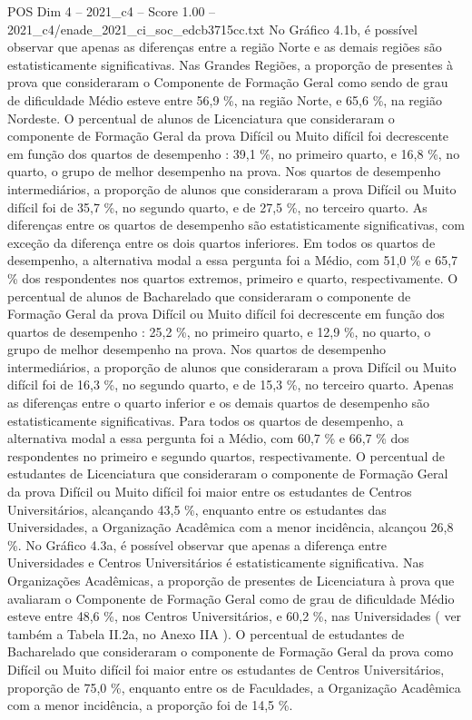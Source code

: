 \begin{textsample}{POS Dim 4 – 2021\_c4 – Score 1.00 – 2021\_c4/enade\_2021\_ci\_soc\_edcb3715cc.txt}
No Gráfico 4.1b, é possível observar que apenas as diferenças entre a região Norte e as demais regiões são estatisticamente significativas.
Nas Grandes Regiões, a proporção de presentes à prova que consideraram o Componente de Formação Geral como sendo de grau de dificuldade Médio esteve entre 56,9 \%, na região Norte, e 65,6 \%, na região Nordeste.
O percentual de alunos de Licenciatura que consideraram o componente de Formação Geral da prova Difícil ou Muito difícil foi decrescente em função dos quartos de desempenho : 39,1 \%, no primeiro quarto, e 16,8 \%, no quarto, o grupo de melhor desempenho na prova.
Nos quartos de desempenho intermediários, a proporção de alunos que consideraram a prova Difícil ou Muito difícil foi de 35,7 \%, no segundo quarto, e de 27,5 \%, no terceiro quarto.
As diferenças entre os quartos de desempenho são estatisticamente significativas, com exceção da diferença entre os dois quartos inferiores.
Em todos os quartos de desempenho, a alternativa modal a essa pergunta foi a Médio, com 51,0 \% e 65,7 \% dos respondentes nos quartos extremos, primeiro e quarto, respectivamente.
O percentual de alunos de Bacharelado que consideraram o componente de Formação Geral da prova Difícil ou Muito difícil foi decrescente em função dos quartos de desempenho : 25,2 \%, no primeiro quarto, e 12,9 \%, no quarto, o grupo de melhor desempenho na prova.
Nos quartos de desempenho intermediários, a proporção de alunos que consideraram a prova Difícil ou Muito difícil foi de 16,3 \%, no segundo quarto, e de 15,3 \%, no terceiro quarto.
Apenas as diferenças entre o quarto inferior e os demais quartos de desempenho são estatisticamente significativas.
Para todos os quartos de desempenho, a alternativa modal a essa pergunta foi a Médio, com 60,7 \% e 66,7 \% dos respondentes no primeiro e segundo quartos, respectivamente.
O percentual de estudantes de Licenciatura que consideraram o componente de Formação Geral da prova Difícil ou Muito difícil foi maior entre os estudantes de Centros Universitários, alcançando 43,5 \%, enquanto entre os estudantes das Universidades, a Organização Acadêmica com a menor incidência, alcançou 26,8 \%.
No Gráfico 4.3a, é possível observar que apenas a diferença entre Universidades e Centros Universitários é estatisticamente significativa.
Nas Organizações Acadêmicas, a proporção de presentes de Licenciatura à prova que avaliaram o Componente de Formação Geral como de grau de dificuldade Médio esteve entre 48,6 \%, nos Centros Universitários, e 60,2 \%, nas Universidades ( ver também a Tabela II.2a, no Anexo IIA ).
O percentual de estudantes de Bacharelado que consideraram o componente de Formação Geral da prova como Difícil ou Muito difícil foi maior entre os estudantes de Centros Universitários, proporção de 75,0 \%, enquanto entre os de Faculdades, a Organização Acadêmica com a menor incidência, a proporção foi de 14,5 \%.

\end{textsample}
